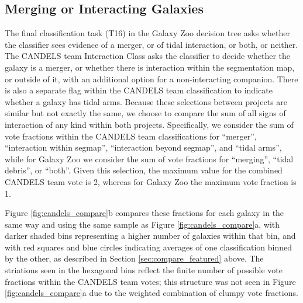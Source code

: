 \documentclass[useAMS,usenatbib]{mn2e}
\begin{document}
{\subsection{Merging or Interacting Galaxies}

The final classification task (T16) in the Galaxy Zoo decision tree asks whether the classifier sees evidence of a merger, or of tidal interaction, or both, or neither. The CANDELS team Interaction Class asks the classifier to decide whether the galaxy is a merger, or whether there is interaction within the segmentation map, or outside of it, with an additional option for a non-interacting companion. There is also a separate flag within the CANDELS team classification to indicate whether a galaxy has tidal arms. Because these selections between projects are similar but not exactly the same, we choose to compare the sum of all signs of interaction of any kind within both projects. Specifically, we consider the sum of vote fractions within the CANDELS team classifications for ``merger'', ``interaction within segmap'',  ``interaction beyond segmap'', and ``tidal arms'', while for Galaxy Zoo we consider the sum of vote fractions for ``merging'', ``tidal debris'', or ``both''. Given this selection, the maximum value for the combined CANDELS team vote is 2, whereas for Galaxy Zoo the maximum vote fraction is 1.

Figure \ref{fig:candels_compare}b compares these fractions for each galaxy in the same way and using the same sample as Figure \ref{fig:candels_compare}a, with darker shaded bins representing a higher number of galaxies within that bin, and with red squares and blue circles indicating averages of one classification binned by the other, as described in Section \ref{sec:compare_featured} above. The striations seen in the hexagonal bins reflect the finite number of possible vote fractions within the CANDELS team votes; this structure was not seen in Figure \ref{fig:candels_compare}a due to the weighted combination of clumpy vote fractions. 


}
\end{document}
